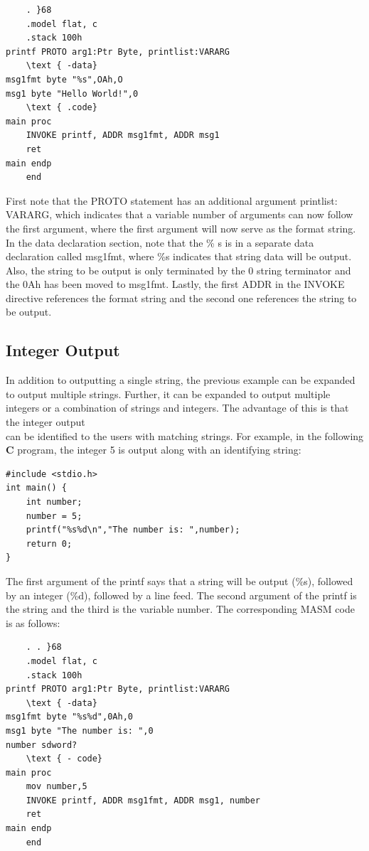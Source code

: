 \documentclass[10pt]{article}
\begin{document}
\begin{verbatim}
    . }68
    .model flat, c
    .stack 100h
printf PROTO arg1:Ptr Byte, printlist:VARARG
    \text { -data}
msg1fmt byte "%s",OAh,O
msg1 byte "Hello World!",0
    \text { .code}
main proc
    INVOKE printf, ADDR msg1fmt, ADDR msg1
    ret
main endp
    end
\end{verbatim}

First note that the PROTO statement has an additional argument printlist: VARARG, which indicates that a variable number of arguments can now follow the first argument, where the first argument will now serve as the format string. In the data declaration section, note that the \% s is in a separate data declaration called msg1fmt, where \%s indicates that string data will be output. Also, the string to be output is only terminated by the 0 string terminator and the 0Ah has been moved to msg1fmt. Lastly, the first ADDR in the INVOKE directive references the format string and the second one references the string to be output.

\subsection*{Integer Output}
In addition to outputting a single string, the previous example can be expanded to output multiple strings. Further, it can be expanded to output multiple integers or a combination of strings and integers. The advantage of this is that the integer output\\
can be identified to the users with matching strings. For example, in the following $\mathbf{C}$ program, the integer 5 is output along with an identifying string:

\begin{verbatim}
#include <stdio.h>
int main() {
    int number;
    number = 5;
    printf("%s%d\n","The number is: ",number);
    return 0;
}
\end{verbatim}

The first argument of the printf says that a string will be output (\%s), followed by an integer (\%d), followed by a line feed. The second argument of the printf is the string and the third is the variable number. The corresponding MASM code is as follows:

\begin{verbatim}
    . . }68
    .model flat, c
    .stack 100h
printf PROTO arg1:Ptr Byte, printlist:VARARG
    \text { -data}
msg1fmt byte "%s%d",0Ah,0
msg1 byte "The number is: ",0
number sdword?
    \text { - code}
main proc
    mov number,5
    INVOKE printf, ADDR msg1fmt, ADDR msg1, number
    ret
main endp
    end
\end{verbatim}
\end{document}
